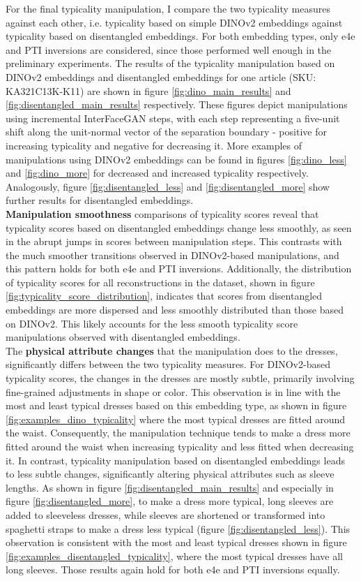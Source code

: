For the final typicality manipulation, I compare the two typicality measures against each other, i.e. typicality based on simple DINOv2 embeddings against typicality based on disentangled embeddings. For both embedding types, only e4e and PTI inversions are considered, since those performed well enough in the preliminary experiments. The results of the typicality manipulation based on DINOv2 embeddings and disentangled embeddings for one article (SKU: KA321C13K-K11) are shown in figure \ref{fig:dino_main_results} and \ref{fig:disentangled_main_results} respectively. These figures depict manipulations using incremental InterFaceGAN steps, with each step representing a five-unit shift along the unit-normal vector of the separation boundary - positive for increasing typicality and negative for decreasing it. More examples of manipulations using DINOv2 embeddings can be found in figures \ref{fig:dino_less} and \ref{fig:dino_more} for decreased and increased typicality respectively. Analogously, figure \ref{fig:disentangled_less} and \ref{fig:disentangled_more} show further results for disentangled embeddings. \\
\textbf{Manipulation smoothness} comparisons of typicality scores reveal that typicality scores based on disentangled embeddings change less smoothly, as seen in the abrupt jumps in scores between manipulation steps. This contrasts with the much smoother transitions observed in DINOv2-based manipulations, and this pattern holds for both e4e and PTI inversions. Additionally, the distribution of typicality scores for all reconstructions in the dataset, shown in figure \ref{fig:typicality_score_distribution}, indicates that scores from disentangled embeddings are more dispersed and less smoothly distributed than those based on DINOv2. This likely accounts for the less smooth typicality score manipulations observed with disentangled embeddings. \\
The \textbf{physical attribute changes} that the manipulation does to the dresses, significantly differs between the two typicality measures. For DINOv2-based typicality scores, the changes in the dresses are mostly subtle, primarily involving fine-grained adjustments in shape or color. This observation is in line with the most and least typical dresses based on this embedding type, as shown in figure \ref{fig:examples_dino_typicality} where the most typical dresses are fitted around the waist. Consequently, the manipulation technique tends to make a dress more fitted around the waist when increasing typicality and less fitted when decreasing it. In contrast, typicality manipulation based on disentangled embeddings leads to less subtle changes, significantly altering physical attributes such as sleeve lengths. As shown in figure \ref{fig:disentangled_main_results} and especially in figure \ref{fig:disentangled_more}, to make a dress more typical, long sleeves are added to sleeveless dresses, while sleeves are shortened or transformed into spaghetti straps to make a dress less typical (figure \ref{fig:disentangled_less}). This observation is consistent with the most and least typical dresses shown in figure \ref{fig:examples_disentangled_typicality}, where the most typical dresses have all long sleeves. Those results again hold for both e4e and PTI inversions equally.\\
